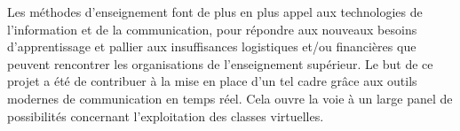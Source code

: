 \conclusion
Les méthodes d’enseignement font de plus en plus appel aux technologies de l’information et de la communication, 
pour répondre aux nouveaux besoins d’apprentissage et pallier aux insuffisances logistiques et/ou financières que 
peuvent rencontrer les organisations de l’enseignement supérieur. Le but de ce projet a été de contribuer à la mise 
en place d’un tel cadre grâce aux outils modernes de communication en temps réel. Cela ouvre la voie à un large panel 
de possibilités concernant l’exploitation des classes virtuelles.